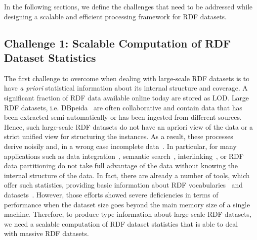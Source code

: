 In the following sections, we define the challenges that need to be addressed while designing a scalable and efficient processing framework for \gls{RDF} datasets.

\subsection{Challenge 1: Scalable Computation of RDF Dataset Statistics}
\label{sec:c1}
The first challenge to overcome when dealing with large-scale \gls{RDF} datasets is to have \textit{a priori} statistical information about its internal structure and coverage.
A significant fraction of \gls{RDF} data available online today are stored as \gls{LOD}.
Large \gls{RDF} datasets, i.e. DBpeida~\cite{dbpedia-swj} are often collaborative and contain data that has been extracted semi-automatically or has been ingested from different sources.
Hence, such large-scale \gls{RDF} datasets do not have an apriori view of the data or a strict unified view for structuring the instances.
As a result, these processes derive noisily and, in a wrong case incomplete data~\cite{zaveri2015quality}.
In particular, for many applications such as data integration~\cite{michel:tel-01508602}, semantic search~\cite{Tonon2012CII}, interlinking~\cite{Dutta2014PAI}, or \gls{RDF} data partitioning do not take full advantage of the data without knowing the internal structure of the data.
In fact, there are already a number of tools, which offer such statistics, providing basic information about \gls{RDF} vocabularies~\cite{vandenbussche2015linked} and datasets~\cite{conf/dexaw/LangeggerW09,ermilov-2013-kesw}.
However, those efforts showed severe deficiencies in terms of performance when the dataset size goes beyond the main memory size of a single machine.
Therefore, to produce type information about large-scale \gls{RDF} datasets, we need a scalable computation of \gls{RDF} dataset statistics that is able to deal with massive \gls{RDF} datasets.

